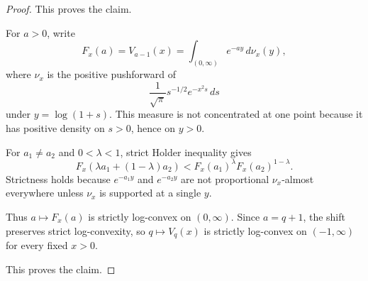 \begin{proof}
This proves the claim.

For \(a>0\), write
\[
F_x(a)=V_{a-1}(x)
=\int_{(0,\infty)} e^{-ay}\,d\nu_x(y),
\]
where \(\nu_x\) is the positive pushforward of
\[
\frac1{\sqrt\pi}s^{-1/2}e^{-x^2s}\,ds
\]
under \(y=\log(1+s)\). This measure is not concentrated at one point because it has positive density on \(s>0\), hence on \(y>0\).

For \(a_1\ne a_2\) and \(0<\lambda<1\), strict Holder inequality gives
\[
F_x(\lambda a_1+(1-\lambda)a_2)
<
F_x(a_1)^\lambda F_x(a_2)^{1-\lambda}.
\]
Strictness holds because \(e^{-a_1y}\) and \(e^{-a_2y}\) are not proportional \(\nu_x\)-almost everywhere unless \(\nu_x\) is supported at a single \(y\).

Thus \(a\mapsto F_x(a)\) is strictly log-convex on \((0,\infty)\). Since \(a=q+1\), the shift preserves strict log-convexity, so \(q\mapsto V_q(x)\) is strictly log-convex on \((-1,\infty)\) for every fixed \(x>0\).

This proves the claim.
\end{proof}

